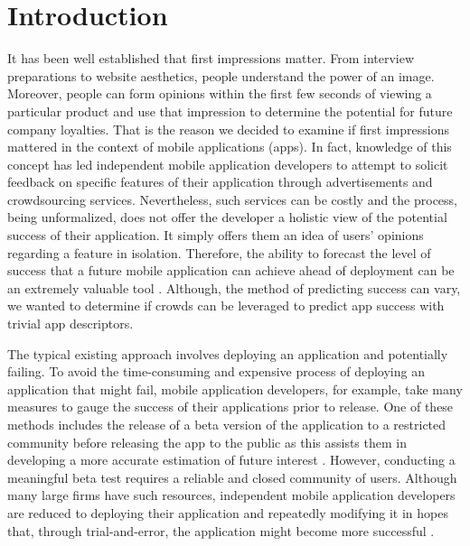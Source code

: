 \section{Introduction}


It has been well established that first impressions matter. From interview preparations to website aesthetics, people understand the power of an image. Moreover, people can form opinions within the first few seconds of viewing a particular product and use that impression to determine the potential for future company loyalties. That is the reason we decided to examine if first impressions mattered in the context of mobile applications (apps). In fact, knowledge of this concept has led independent mobile application developers to attempt to solicit feedback on specific features of their application through advertisements and crowdsourcing services. Nevertheless, such services can be costly and the process, being unformalized, does not offer the developer a holistic view of the potential success of their application. It simply offers them an idea of users' opinions regarding a feature in isolation. Therefore, the ability to forecast the level of success that a future mobile application can achieve ahead of deployment can be an extremely valuable tool \cite{tohidi06:getting}. Although, the method of predicting success can vary, we wanted to determine if crowds can be leveraged to predict app success with trivial app descriptors.

The typical existing approach involves deploying an application and potentially failing. To avoid the time-consuming and expensive process of deploying an application that might fail, mobile application developers, for example, take many measures to gauge the success of their applications prior to release. One of these methods includes the release of a beta version of the application to a restricted community before releasing the app to the public as this assists them in developing a more accurate estimation of future interest \cite{betatest}. However, conducting a meaningful beta test requires a reliable and closed community of users. Although many large firms have such resources, independent mobile application developers are reduced to deploying their application and repeatedly modifying it in hopes that, through trial-and-error, the application might become more successful \cite{betatest}.

